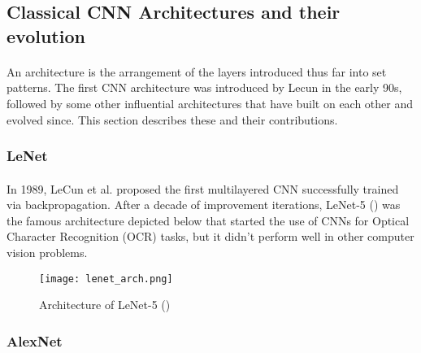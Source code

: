 \subsection{Classical \gls{CNN} Architectures and their evolution} \label{classic_cnn}
\paragraph{}
An architecture is the arrangement of the layers introduced thus far into set patterns. The first \gls{CNN} architecture was introduced by Lecun in the early 90s, followed by some other influential architectures that have built on each other and evolved since. This section describes these and their contributions.

\subsubsection{LeNet}
\paragraph{}
In 1989, LeCun et al. proposed the first multilayered \gls{CNN} successfully trained via backpropagation. After a decade of improvement iterations, LeNet-5 (\cite{726791}) was the famous architecture depicted below that started the use of \gls{CNN}s for Optical Character Recognition (OCR) tasks, but it didn't perform well in other computer vision problems.

    \begin{figure}[hbt!]
        \centering
        \texttt{[image: lenet\_arch.png]}
        \caption{Architecture of LeNet-5 (\cite{726791})}
        \label{fig_lenet}
    \end{figure}
    
\subsubsection{AlexNet}
